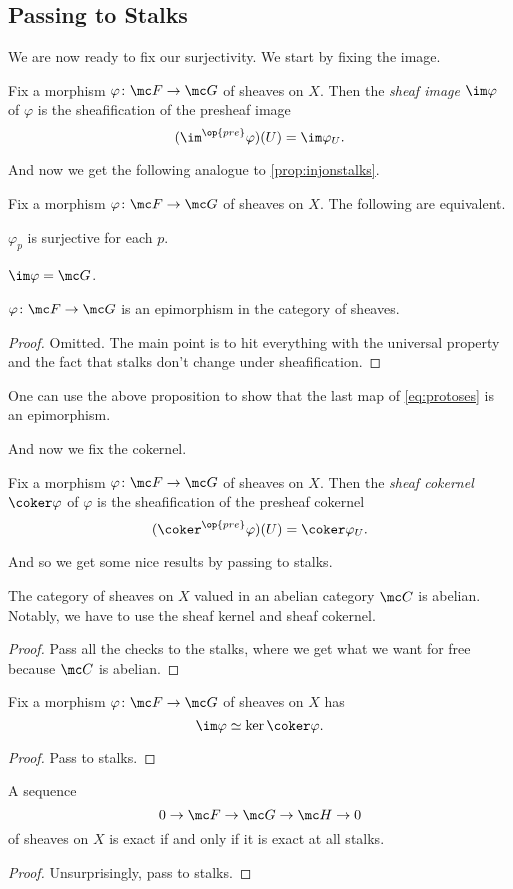 \documentclass[../notes.tex]{subfiles}
\begin{document}
\subsection{Passing to Stalks}
We are now ready to fix our surjectivity. We start by fixing the image.
\begin{defi}
	Fix a morphism $\varphi\colon\mc F\to\mc G$ of sheaves on $X$. Then the \textit{sheaf image $\im\varphi$} of $\varphi$ is the sheafification of the presheaf image
	\[(\im^{\op{pre}}\varphi)(U)=\im\varphi_U.\]
\end{defi}
And now we get the following analogue to \autoref{prop:injonstalks}.
\begin{proposition}
	Fix a morphism $\varphi\colon\mc F\to\mc G$ of sheaves on $X$. The following are equivalent.
	\begin{listalph}
		\item $\varphi_p$ is surjective for each $p$.
		\item $\im\varphi=\mc G$.
		\item $\varphi\colon\mc F\to\mc G$ is an epimorphism in the category of sheaves.
	\end{listalph}
\end{proposition}
\begin{proof}
	Omitted. The main point is to hit everything with the universal property and the fact that stalks don't change under sheafification.
\end{proof}
\begin{remark}
	One can use the above proposition to show that the last map of \autoref{eq:protoses} is an epimorphism.
\end{remark}
And now we fix the cokernel.
\begin{definition}
	Fix a morphism $\varphi\colon\mc F\to\mc G$ of sheaves on $X$. Then the \textit{sheaf cokernel $\coker\varphi$} of $\varphi$ is the sheafification of the presheaf cokernel
	\[(\coker^{\op{pre}}\varphi)(U)=\coker\varphi_U.\]
\end{definition}
And so we get some nice results by passing to stalks.
\begin{proposition}
	The category of sheaves on $X$ valued in an abelian category $\mc C$ is abelian. Notably, we have to use the sheaf kernel and sheaf cokernel.
\end{proposition}
\begin{proof}
	Pass all the checks to the stalks, where we get what we want for free because $\mc C$ is abelian.
\end{proof}
\begin{proposition}
	Fix a morphism $\varphi\colon\mc F\to\mc G$ of sheaves on $X$ has
	\[\im\varphi\simeq\ker\coker\varphi.\]
\end{proposition}
\begin{proof}
	Pass to stalks.
\end{proof}
\begin{proposition}
	A sequence
	\[0\to\mc F\to\mc G\to\mc H\to0\]
	of sheaves on $X$ is exact if and only if it is exact at all stalks.
\end{proposition}
\begin{proof}
	Unsurprisingly, pass to stalks.
\end{proof}
\end{document}
